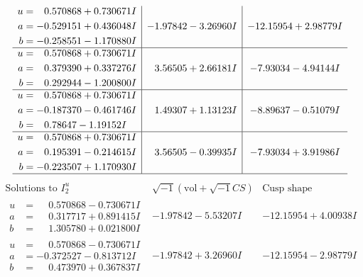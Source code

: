 \documentclass[1p]{elsarticle_modified}
\theoremstyle{definition}
\newcommand{\I}{\sqrt{-1}}
\begin{document}
$$\begin{array}{c|c|c}
\begin{aligned}
u &= \phantom{-}0.570868 + 0.730671 I \\
a &= -0.529151 + 0.436048 I \\
b &= -0.258551 - 1.170880 I\end{aligned}
 & -1.97842 - 3.26960 I & -12.15954 + 2.98779 I \\ \hline\begin{aligned}
u &= \phantom{-}0.570868 + 0.730671 I \\
a &= \phantom{-}0.379390 + 0.337276 I \\
b &= \phantom{-}0.292944 - 1.200800 I\end{aligned}
 & \phantom{-}3.56505 + 2.66181 I & -7.93034 - 4.94144 I \\ \hline\begin{aligned}
u &= \phantom{-}0.570868 + 0.730671 I \\
a &= -0.187370 - 0.461746 I \\
b &= \phantom{-}0.78647 - 1.19152 I\end{aligned}
 & \phantom{-}1.49307 + 1.13123 I & -8.89637 - 0.51079 I \\ \hline\begin{aligned}
u &= \phantom{-}0.570868 + 0.730671 I \\
a &= \phantom{-}0.195391 - 0.214615 I \\
b &= -0.223507 + 1.170930 I\end{aligned}
 & \phantom{-}3.56505 - 0.39935 I & -7.93034 + 3.91986 I\\
 \hline 
 \end{array}$$\newpage$$\begin{array}{c|c|c}  
\text{Solutions to }I^u_{2}& \I (\text{vol} + \sqrt{-1}CS) & \text{Cusp shape}\\
 \hline 
\begin{aligned}
u &= \phantom{-}0.570868 - 0.730671 I \\
a &= \phantom{-}0.317717 + 0.891415 I \\
b &= \phantom{-}1.305780 + 0.021800 I\end{aligned}
 & -1.97842 - 5.53207 I & -12.15954 + 4.00938 I \\ \hline\begin{aligned}
u &= \phantom{-}0.570868 - 0.730671 I \\
a &= -0.372527 - 0.813712 I \\
b &= \phantom{-}0.473970 + 0.367837 I\end{aligned}
 & -1.97842 + 3.26960 I & -12.15954 - 2.98779 I \\ \hline\begin{aligned}

\end{aligned}
\end{array}$$
\end{document}
